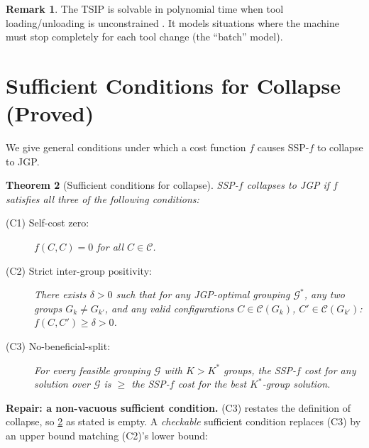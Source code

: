 \documentclass[11pt,a4paper]{article}
\theoremstyle{plain}
\newtheorem{theorem}{Theorem}[section]
\theoremstyle{definition}
\newtheorem{remark}[theorem]{Remark}
\newcommand{\Kstar}{K^*}
\newcommand{\calG}{\mathcal{G}}
\begin{document}
\begin{remark}
The TSIP is solvable in polynomial time when tool loading/unloading is unconstrained
\cite{Adjiashvili2015}. It models situations where the machine must stop completely
for each tool change (the ``batch'' model).
\end{remark}

\section{Sufficient Conditions for Collapse (Proved)}
\label{sec:sufficient}

We give general conditions under which a cost function $f$ causes SSP-$f$ to
collapse to JGP.

\begin{thmbox}
\begin{theorem}[Sufficient conditions for collapse]
\label{thm:sufficient}
SSP-$f$ collapses to JGP if $f$ satisfies all three of the following conditions:
\begin{description}
\item[(C1) Self-cost zero:] $f(C, C) = 0$ for all $C \in \mathcal{C}$.
\item[(C2) Strict inter-group positivity:] There exists $\delta > 0$ such that
  for any JGP-optimal grouping $\calG^*$, any two groups $G_k \ne G_{k'}$, and
  any valid configurations $C \in \mathcal{C}(G_k)$, $C' \in \mathcal{C}(G_{k'})$:
  $f(C, C') \ge \delta > 0$.
\item[(C3) No-beneficial-split:] For every feasible grouping $\calG$ with
  $K > \Kstar$ groups, the SSP-$f$ cost for any solution over $\calG$ is $\ge$
  the SSP-$f$ cost for the best $\Kstar$-group solution.
\end{description}
\end{theorem}
\end{thmbox}

\begin{warnbox}
\textbf{Repair: a non-vacuous sufficient condition.} (C3) restates the definition of
collapse, so \cref{thm:sufficient} as stated is empty. A \emph{checkable} sufficient
condition replaces (C3) by an upper bound matching (C2)'s lower bound:
\end{warnbox}
\end{document}
